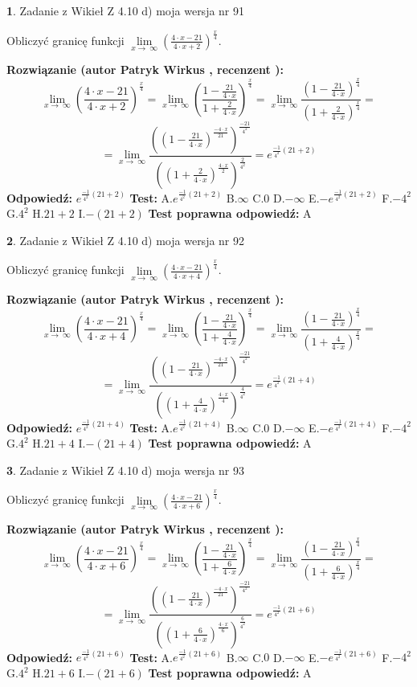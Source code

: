 \documentclass[12pt, a4paper]{article}
\theoremstyle{definition} %
\newtheorem{zad}{}
\newcommand{\zadStart}[1]{\begin{zad}#1\newline}
\newcommand{\zadStop}{\end{zad}}
\newcommand{\rozwStart}[2]{\noindent \textbf{Rozwiązanie (autor #1 , recenzent #2): }\newline}
\newcommand{\rozwStop}{\newline}
\newcommand{\odpStart}{\noindent \textbf{Odpowiedź:}\newline}
\newcommand{\odpStop}{\newline}
\newcommand{\testStart}{\noindent \textbf{Test:}\newline}
\newcommand{\testStop}{\newline}
\newcommand{\kluczStart}{\noindent \textbf{Test poprawna odpowiedź:}\newline}
\newcommand{\kluczStop}{\newline}
\begin{document}
\zadStart{Zadanie z Wikieł Z 4.10 d) moja wersja nr 91}


Obliczyć granicę funkcji  $\lim\limits_{x\to\ \infty}(\frac{4\cdot x-21}{4\cdot x+2})^{\frac{x}{4}}$.
\zadStop
\rozwStart{Patryk Wirkus}{}
$$\lim\limits_{x\to\ \infty}(\frac{4\cdot x-21}{4\cdot x+2})^{\frac{x}{4}} = \lim\limits_{x\to\ \infty}(\frac{1-\frac{21}{4\cdot x}}{1+\frac{2}{4\cdot x}})^{\frac{x}{4}}=\lim\limits_{x\to\ \infty}\frac{(1-\frac{21}{4\cdot x})^{\frac{x}{4}}}{(1+\frac{2}{4\cdot x})^{\frac{x}{4}}}=$$
$$=\lim\limits_{x\to\ \infty}\frac{((1-\frac{21}{4\cdot x})^{\frac{-4\cdot x}{21}})^{\frac{-21}{4^{2}}}}{((1+\frac{2}{4\cdot x})^{\frac{4\cdot x}{2}})^{\frac{2}{4^{2}}}}=e^{\frac{-1}{4^{2}}(21+2)}$$
\rozwStop
\odpStart
$e^{\frac{-1}{4^{2}}(21+2)}$
\odpStop
\testStart
A.$e^{\frac{-1}{4^{2}}(21+2)}$ B.$\infty$ C.$0$ D.$-\infty$ E.$-e^{\frac{-1}{4^{2}}(21+2)}$
F.$-4^{2}$ G.$4^{2}$
H.$21+2$
I.$-(21+2)$
\testStop
\kluczStart
A
\kluczStop



\zadStart{Zadanie z Wikieł Z 4.10 d) moja wersja nr 92}


Obliczyć granicę funkcji  $\lim\limits_{x\to\ \infty}(\frac{4\cdot x-21}{4\cdot x+4})^{\frac{x}{4}}$.
\zadStop
\rozwStart{Patryk Wirkus}{}
$$\lim\limits_{x\to\ \infty}(\frac{4\cdot x-21}{4\cdot x+4})^{\frac{x}{4}} = \lim\limits_{x\to\ \infty}(\frac{1-\frac{21}{4\cdot x}}{1+\frac{4}{4\cdot x}})^{\frac{x}{4}}=\lim\limits_{x\to\ \infty}\frac{(1-\frac{21}{4\cdot x})^{\frac{x}{4}}}{(1+\frac{4}{4\cdot x})^{\frac{x}{4}}}=$$
$$=\lim\limits_{x\to\ \infty}\frac{((1-\frac{21}{4\cdot x})^{\frac{-4\cdot x}{21}})^{\frac{-21}{4^{2}}}}{((1+\frac{4}{4\cdot x})^{\frac{4\cdot x}{4}})^{\frac{4}{4^{2}}}}=e^{\frac{-1}{4^{2}}(21+4)}$$
\rozwStop
\odpStart
$e^{\frac{-1}{4^{2}}(21+4)}$
\odpStop
\testStart
A.$e^{\frac{-1}{4^{2}}(21+4)}$ B.$\infty$ C.$0$ D.$-\infty$ E.$-e^{\frac{-1}{4^{2}}(21+4)}$
F.$-4^{2}$ G.$4^{2}$
H.$21+4$
I.$-(21+4)$
\testStop
\kluczStart
A
\kluczStop



\zadStart{Zadanie z Wikieł Z 4.10 d) moja wersja nr 93}


Obliczyć granicę funkcji  $\lim\limits_{x\to\ \infty}(\frac{4\cdot x-21}{4\cdot x+6})^{\frac{x}{4}}$.
\zadStop
\rozwStart{Patryk Wirkus}{}
$$\lim\limits_{x\to\ \infty}(\frac{4\cdot x-21}{4\cdot x+6})^{\frac{x}{4}} = \lim\limits_{x\to\ \infty}(\frac{1-\frac{21}{4\cdot x}}{1+\frac{6}{4\cdot x}})^{\frac{x}{4}}=\lim\limits_{x\to\ \infty}\frac{(1-\frac{21}{4\cdot x})^{\frac{x}{4}}}{(1+\frac{6}{4\cdot x})^{\frac{x}{4}}}=$$
$$=\lim\limits_{x\to\ \infty}\frac{((1-\frac{21}{4\cdot x})^{\frac{-4\cdot x}{21}})^{\frac{-21}{4^{2}}}}{((1+\frac{6}{4\cdot x})^{\frac{4\cdot x}{6}})^{\frac{6}{4^{2}}}}=e^{\frac{-1}{4^{2}}(21+6)}$$
\rozwStop
\odpStart
$e^{\frac{-1}{4^{2}}(21+6)}$
\odpStop
\testStart
A.$e^{\frac{-1}{4^{2}}(21+6)}$ B.$\infty$ C.$0$ D.$-\infty$ E.$-e^{\frac{-1}{4^{2}}(21+6)}$
F.$-4^{2}$ G.$4^{2}$
H.$21+6$
I.$-(21+6)$
\testStop
\kluczStart
A
\kluczStop
\end{document}

